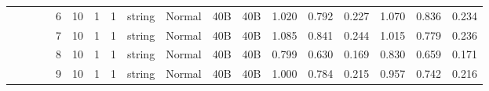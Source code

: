 \begin{landscape}
\begin{table}[]
{\begin{tabular}{@{}ccccllllllllllllll@{}}
                                                                                   &                              &                                &                                                                                                          & 6                                                     & 10                                       & 1                                          & 1                                 & string                           & Normal                             & 40B                                           & 40B                                             & 1.020                   & 0.792    & 0.227                        & 1.070                   & 0.836    & 0.234                        \\
                                                                                   &                              &                                &                                                                                                          & 7                                                     & 10                                       & 1                                          & 1                                 & string                           & Normal                             & 40B                                           & 40B                                             & 1.085                   & 0.841    & 0.244                        & 1.015                   & 0.779    & 0.236                        \\
                                                                                   &                              &                                &                                                                                                          & 8                                                     & 10                                       & 1                                          & 1                                 & string                           & Normal                             & 40B                                           & 40B                                             & 0.799                   & 0.630    & 0.169                        & 0.830                   & 0.659    & 0.171                        \\
                                                                                   &                              &                                &                                                                                                          & 9                                                     & 10                                       & 1                                          & 1                                 & string                           & Normal                             & 40B                                           & 40B                                             & 1.000                   & 0.784    & 0.215                        & 0.957                   & 0.742    & 0.216                        \\

\end{tabular}}
\end{table}
\end{landscape}

